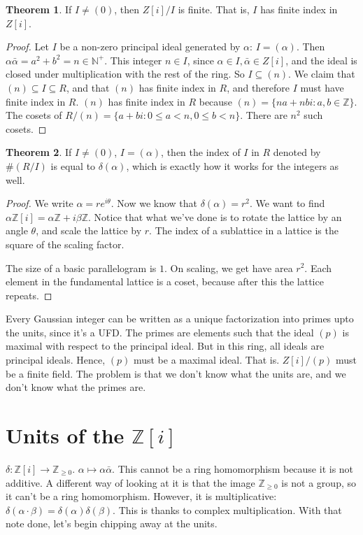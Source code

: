 \documentclass{book}
\newcommand{\N}{\ensuremath{\mathbb{N}}}
\newcommand{\Z}{\ensuremath{\mathbb{Z}}}
\theoremstyle{definition}
\newtheorem{theorem}{Theorem}
\begin{document}
\begin{theorem}
If $I \neq (0)$, then $Z[i]/I$ is finite. That is, $I$ has finite index in $Z[i]$.
\end{theorem}
\begin{proof}
Let $I$ be a non-zero principal ideal generated by $\alpha$: 
$I = (\alpha)$. Then $\alpha \bar \alpha = a^2 + b^2 = n \in \N^+$.
This integer $n \in I$, since $\alpha \in I, \bar \alpha \in Z[i]$, and the ideal
is closed under multiplication with the rest of the ring. So $I \subseteq (n)$.
We claim that $(n) \subseteq I \subseteq R$, and that $(n)$ has finite index
in $R$, and therefore $I$ must have finite index in $R$. $(n)$ has finite
index in $R$ because $(n) = \{ n a + n b i : a, b \in \Z \}$. The cosets
of $R/(n) = \{ a + bi : 0 \leq a < n, 0 \leq b < n \}$. There are $n^2$ such
cosets.
\end{proof}

\begin{theorem}
If $I \neq (0)$, $I = (\alpha)$, then the index of $I$ in $R$ denoted by
$\#(R/I)$ is equal to $\delta(\alpha)$,
which is exactly how it works for the integers as well.
\end{theorem}
\begin{proof}
We write $\alpha = re^{i \theta}$. Now we know that $\delta(\alpha) = r^2$.
We want to find $\alpha \Z[i] = \alpha \Z + i \beta \Z$. Notice that
what we've done is to rotate the lattice by an angle $\theta$, and scale the lattice by $r$.
The index of a sublattice in a lattice is the square of the scaling factor. 

The size of a basic parallelogram is $1$. On scaling, we get have area $r^2$.
Each element in the fundamental lattice is a coset, because after this
the lattice repeats.
\end{proof}

Every Gaussian integer can be written as a unique factorization into primes
upto the units, since it's a UFD. The primes are elements such that the ideal $(p)$ is maximal
with respect to the principal ideal. But in this ring, all ideals are principal
ideals. Hence, $(p)$ must be a maximal ideal. That is. $Z[i]/(p)$ must be
a finite field. The problem is that we don't know what the units are, and we don't
know what the primes are. 

\section{Units of the $\Z[i]$}
$\delta: \Z[i] \rightarrow \Z_{\geq 0}$. $\alpha \mapsto \alpha \bar \alpha$. This cannot
be a ring homomorphism because it is not additive. A different way of looking
at it is that the image $\Z_{\geq 0}$ is not a group, so it can't be
a ring homomorphism. However, it is multiplicative: $\delta(\alpha \cdot \beta) = \delta(\alpha) \delta(\beta)$.
This is thanks to complex multiplication. With that note done,
let's begin chipping away at the units.
\end{document}
